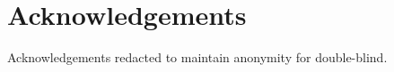 \documentclass{article}
\begin{document}
\section{Acknowledgements}

Acknowledgements redacted to maintain anonymity for double-blind. 






\end{document}
